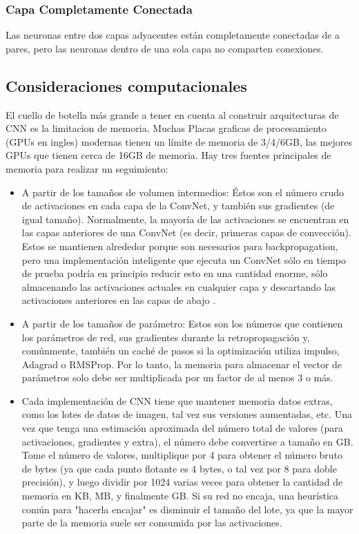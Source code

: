 \documentclass[a4paper,11pt,spanish]{book}
\begin{document}
      \subsubsection{Capa Completamente Conectada} 
	Las neuronas entre dos capas adyacentes están completamente conectadas de a pares, pero las neuronas dentro de una sola capa no comparten conexiones.

    \subsection {Consideraciones computacionales}
      El cuello de botella más grande a tener en cuenta al construir arquitecturas de CNN es la limitacion de memoria. 
      Muchas Placas graficas de procesamiento (GPUs en ingles) modernas tienen un límite de memoria de 3/4/6GB, las mejores GPUs que tienen cerca de 16GB de memoria. 
      Hay tres fuentes principales de memoria para realizar un seguimiento:
      \begin{itemize}
	\item A partir de los tamaños de volumen intermedios: Éstos son el número crudo de activaciones en cada capa de la ConvNet, y también sus gradientes (de igual tamaño). Normalmente, la mayoría de las activaciones se encuentran en las capas anteriores de una ConvNet (es decir, primeras capas de convección). Estos se mantienen alrededor porque son necesarios para backpropagation, pero una implementación inteligente que ejecuta un ConvNet sólo en tiempo de prueba podría en principio reducir esto en una cantidad enorme, sólo almacenando las activaciones actuales en cualquier capa y descartando las activaciones anteriores en las capas de abajo .
	\item A partir de los tamaños de parámetro: Estos son los números que contienen los parámetros de red, sus gradientes durante la retropropagación y, comúnmente, también un caché de pasos si la optimización utiliza impulso, Adagrad o RMSProp. Por lo tanto, la memoria para almacenar el vector de parámetros solo debe ser multiplicada por un factor de al menos 3 o más.
	\item Cada implementación de CNN tiene que mantener memoria datos extras, como los lotes de datos de imagen, tal vez sus versiones aumentadas, etc.
	Una vez que tenga una estimación aproximada del número total de valores (para activaciones, gradientes y extra), el número debe convertirse a tamaño en GB. Tome el número de valores, multiplique por 4 para obtener el número bruto de bytes (ya que cada punto flotante es 4 bytes, o tal vez por 8 para doble precisión), y luego dividir por 1024 varias veces para obtener la cantidad de memoria en KB, MB, y finalmente GB. Si su red no encaja, una heurística común para "hacerla encajar" es disminuir el tamaño del lote, ya que la mayor parte de la memoria suele ser consumida por las activaciones.
      \end{itemize}
\end{document}
